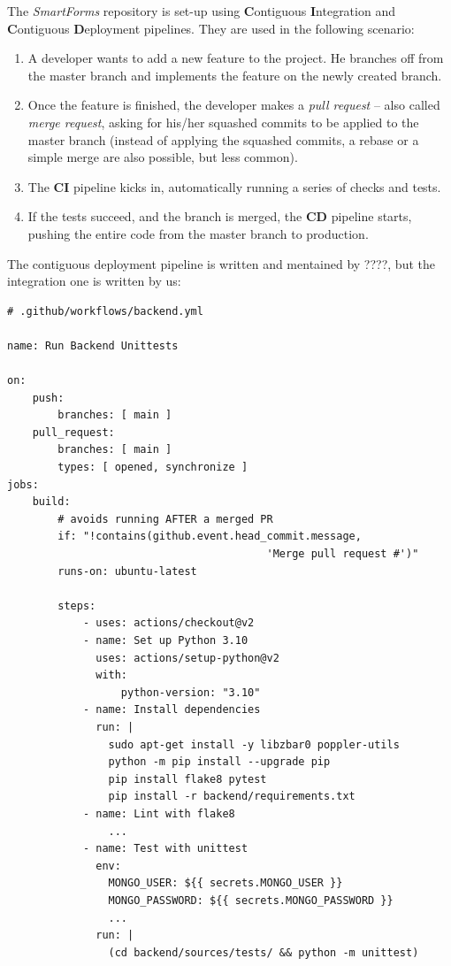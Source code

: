 \documentclass[11pt, a4paper]{report}
\begin{document}
The \textit{SmartForms} repository is set-up using \textbf{C}ontiguous \textbf{I}ntegration and \textbf{C}ontiguous \textbf{D}eployment pipelines. They are used in the following scenario:
\begin{enumerate}
	\item A developer wants to add a new feature to the project. He branches off from the master branch and implements the feature on the newly created branch.
	\item Once the feature is finished, the developer makes a \textit{pull request} -- also called \textit{merge request}, asking for his/her squashed commits to be applied to the master branch (instead of applying the squashed commits, a rebase or a simple merge are also possible, but less common).
	\item The \textbf{CI} pipeline kicks in, automatically running a series of checks and tests.
	\item If the tests succeed, and the branch is merged, the \textbf{CD} pipeline starts, pushing the entire code from the master branch to production.
\end{enumerate}

The contiguous deployment pipeline is written and mentained by ????\cite{felix}, but the integration one is written by us:

\begin{verbatim}
# .github/workflows/backend.yml

name: Run Backend Unittests

on:
    push:
        branches: [ main ]
    pull_request:
        branches: [ main ]
        types: [ opened, synchronize ]
jobs:
    build:
        # avoids running AFTER a merged PR
        if: "!contains(github.event.head_commit.message,
                                         'Merge pull request #')"
        runs-on: ubuntu-latest

        steps:
            - uses: actions/checkout@v2
            - name: Set up Python 3.10
              uses: actions/setup-python@v2
              with:
                  python-version: "3.10"
            - name: Install dependencies
              run: |
                sudo apt-get install -y libzbar0 poppler-utils
                python -m pip install --upgrade pip
                pip install flake8 pytest
                pip install -r backend/requirements.txt
            - name: Lint with flake8
                ...
            - name: Test with unittest
              env:
                MONGO_USER: ${{ secrets.MONGO_USER }} 
                MONGO_PASSWORD: ${{ secrets.MONGO_PASSWORD }}
                ...
              run: |
                (cd backend/sources/tests/ && python -m unittest)
\end{verbatim}
\end{document}
